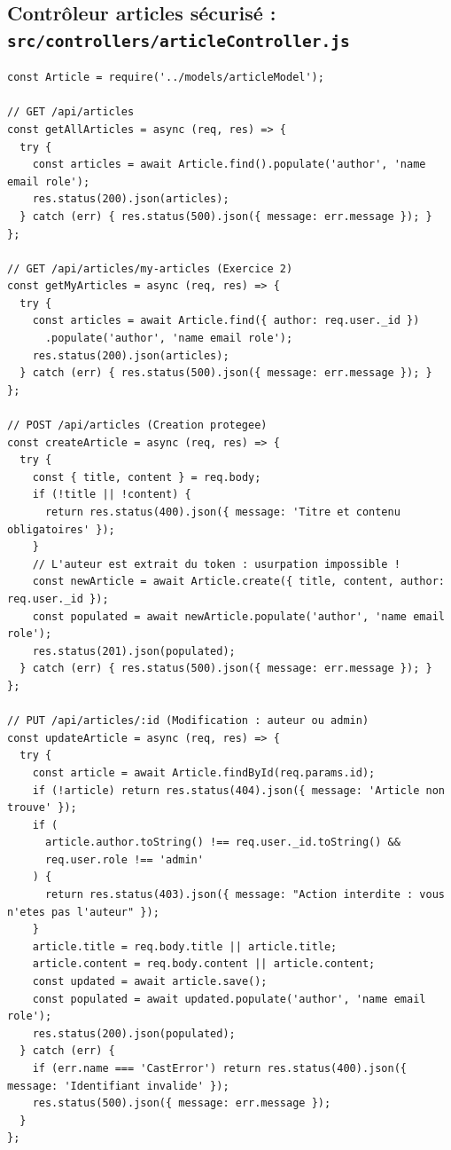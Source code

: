 \documentclass[12pt, a4paper]{article}
\begin{document}
\subsection{Contrôleur articles sécurisé : \texttt{src/controllers/articleController.js}}
\begin{lstlisting}
const Article = require('../models/articleModel');

// GET /api/articles
const getAllArticles = async (req, res) => {
  try {
    const articles = await Article.find().populate('author', 'name email role');
    res.status(200).json(articles);
  } catch (err) { res.status(500).json({ message: err.message }); }
};

// GET /api/articles/my-articles (Exercice 2)
const getMyArticles = async (req, res) => {
  try {
    const articles = await Article.find({ author: req.user._id })
      .populate('author', 'name email role');
    res.status(200).json(articles);
  } catch (err) { res.status(500).json({ message: err.message }); }
};

// POST /api/articles (Creation protegee)
const createArticle = async (req, res) => {
  try {
    const { title, content } = req.body;
    if (!title || !content) {
      return res.status(400).json({ message: 'Titre et contenu obligatoires' });
    }
    // L'auteur est extrait du token : usurpation impossible !
    const newArticle = await Article.create({ title, content, author: req.user._id });
    const populated = await newArticle.populate('author', 'name email role');
    res.status(201).json(populated);
  } catch (err) { res.status(500).json({ message: err.message }); }
};

// PUT /api/articles/:id (Modification : auteur ou admin)
const updateArticle = async (req, res) => {
  try {
    const article = await Article.findById(req.params.id);
    if (!article) return res.status(404).json({ message: 'Article non trouve' });
    if (
      article.author.toString() !== req.user._id.toString() &&
      req.user.role !== 'admin'
    ) {
      return res.status(403).json({ message: "Action interdite : vous n'etes pas l'auteur" });
    }
    article.title = req.body.title || article.title;
    article.content = req.body.content || article.content;
    const updated = await article.save();
    const populated = await updated.populate('author', 'name email role');
    res.status(200).json(populated);
  } catch (err) {
    if (err.name === 'CastError') return res.status(400).json({ message: 'Identifiant invalide' });
    res.status(500).json({ message: err.message });
  }
};


\end{lstlisting}
\end{document}
